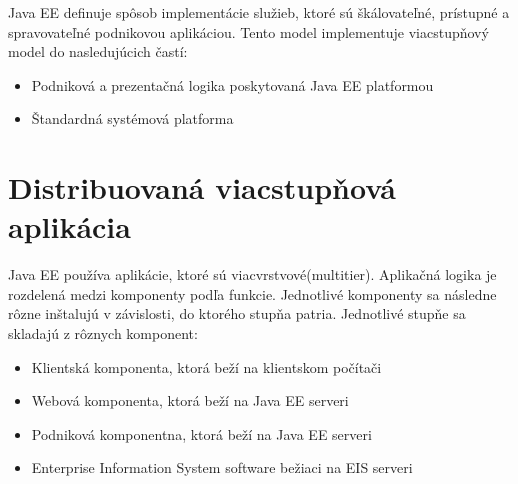 \indent Java EE definuje spôsob implementácie služieb, ktoré sú škálovateľné, prístupné a spravovateľné podnikovou aplikáciou. Tento model implementuje viacstupňový model do nasledujúcich častí:
\begin{itemize}
\item Podniková a prezentačná logika poskytovaná Java EE platformou
\item Štandardná systémová platforma 
\end{itemize}

\section{Distribuovaná viacstupňová aplikácia}
Java EE používa aplikácie, ktoré sú viacvrstvové(multitier). Aplikačná logika je rozdelená medzi komponenty podľa funkcie.\cite{Pravidla} Jednotlivé komponenty sa následne rôzne inštalujú v závislosti, do ktorého stupňa patria. Jednotlivé stupňe sa skladajú z rôznych komponent:
\begin{itemize}
\item Klientská komponenta, ktorá beží na klientskom počítači
\item Webová komponenta, ktorá beží na Java EE serveri
\item Podniková komponentna, ktorá beží na Java EE serveri
\item Enterprise Information System software bežiaci na EIS serveri
\end{itemize}

